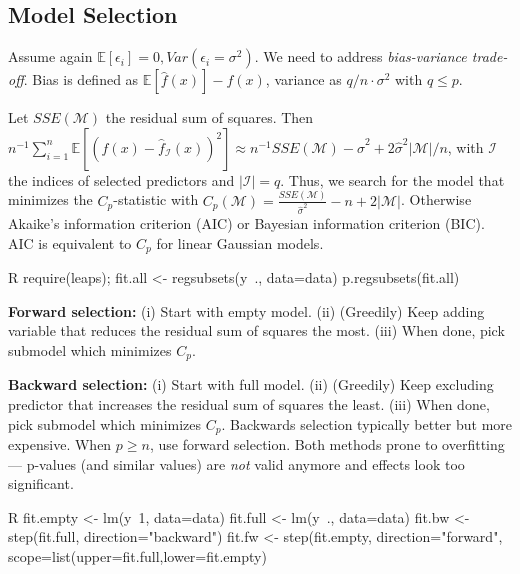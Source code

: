 \subsection{Model Selection}\label{subsec:model_selection}
\begin{sectionbox}\nospacing{}
  Assume again $\mathbb{E}[\epsilon_{i}] = 0, Var(\epsilon_{i} = \sigma^{2})$.
  We need to address \emph{bias-variance trade-off}.
  Bias is defined as $\mathbb{E} [\hat f(x)] - f(x)$, variance as $q/n \cdot \sigma^{2}$ with $q \leq p$.
\end{sectionbox}
\begin{sectionbox}\nospacing{}
  Let $SSE(\mathcal{M})$ the residual sum of squares.
  Then $n^{-1} \sum_{i=1}^{n} \mathbb{E}\left[{(f(x) - \hat f_{\mathcal{I}}(x))}^{2}\right] \approx n^{-1}SSE(\mathcal{M})-\hat \sigma^{2} + 2\hat\sigma^{2}|\mathcal{M}|/n$, with $\mathcal{I}$ the indices of selected predictors and $|\mathcal{I}| = q$.
  Thus, we search for the model that minimizes the $C_{p}$-statistic with $C_{p}(\mathcal{M}) = \frac{SSE(\mathcal{M})}{\hat \sigma^{2}} - n + 2|\mathcal{M}|$.
  Otherwise Akaike's information criterion (AIC) or Bayesian information criterion (BIC). AIC is equivalent to $C_{p}$ for linear Gaussian models.
  \begin{mintlinebox}{R}
    require(leaps); fit.all <- regsubsets(y~., data=data)
    p.regsubsets(fit.all)
  \end{mintlinebox}
\end{sectionbox}
\begin{sectionbox}\nospacing{}
  \textbf{Forward selection:} (i) Start with empty model. (ii) (Greedily) Keep adding variable that reduces the residual sum of squares the most. (iii) When done, pick submodel which minimizes $C_{p}$.

  \textbf{Backward selection:} (i) Start with full model. (ii) (Greedily) Keep excluding predictor that increases the residual sum of squares the least. (iii) When done, pick submodel which minimizes $C_{p}$.
  Backwards selection typically better but more expensive. When $p \geq n$, use forward selection.
  Both methods prone to overfitting --- p-values (and similar values) are \emph{not} valid anymore and effects look too significant.
  \begin{mintlinebox}{R}
    fit.empty <- lm(y~1, data=data)
    fit.full <- lm(y~., data=data)
    fit.bw <- step(fit.full, direction="backward")
    fit.fw <- step(fit.empty, direction="forward", scope=list(upper=fit.full,lower=fit.empty)
  \end{mintlinebox}

\end{sectionbox}

